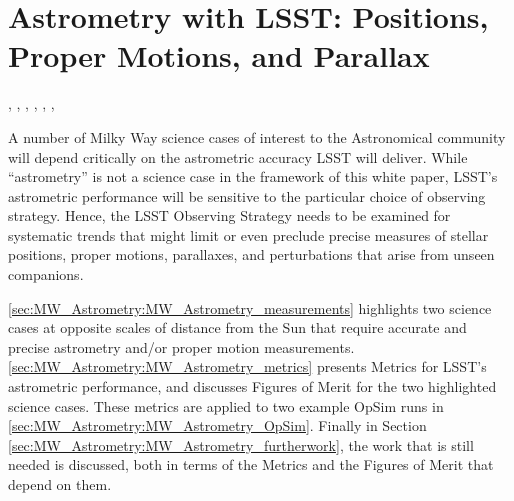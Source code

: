 %
%
%

\section{Astrometry with LSST: Positions, Proper Motions, and Parallax}
\def\secname{MW_Astrometry}\label{sec:\secname}

, , , ,
, , 

A number of Milky Way science cases of interest to the Astronomical
community will depend critically on the astrometric accuracy LSST will
deliver. While ``astrometry'' is not a science case in the framework
of this white paper, LSST's astrometric performance will be sensitive
to the particular choice of observing strategy.
Hence, the LSST Observing Strategy needs to be examined for systematic
trends that might limit or even preclude precise measures of
stellar positions, proper motions, parallaxes, and perturbations that
arise from unseen companions.

\autoref{sec:\secname:MW_Astrometry_measurements} highlights two
science cases at opposite scales of distance from the Sun that require
accurate and precise astrometry and/or proper motion
measurements. \autoref{sec:\secname:MW_Astrometry_metrics} presents
Metrics for LSST's astrometric performance, and discusses Figures of
Merit for the two highlighted science cases. These metrics are applied to two example OpSim runs in
\autoref{sec:\secname:MW_Astrometry_OpSim}. Finally in Section
\ref{sec:\secname:MW_Astrometry_furtherwork}, the work that is still
needed is discussed, both in terms of the Metrics and the Figures of
Merit that depend on them.



